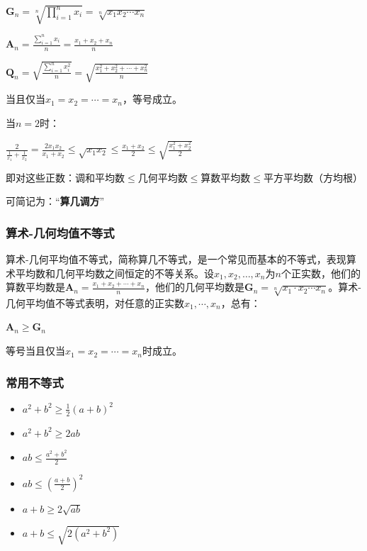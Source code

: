 \documentclass[UTF8]{ctexbook}
\newcommand{\upDownSum}[2]{\sum\limits_{#2}^{#1}}
\newcommand{\upDownProd}[2]{\prod\limits_{#2}^{#1}}
\begin{document}
{{{{$\mathbf{G}_n = \sqrt[n]{\upDownProd{n}{i = 1}x_i} = \sqrt[n]{x_1x_2\dotsm x_n}$

$\mathbf{A}_n = \frac{\upDownSum{n}{i = 1}x_i}{n} = \frac{x_1 + x_2 + x_n}{n}$

$\mathbf{Q}_n = \sqrt{\frac{\upDownSum{n}{i = 1}x^2_i}{n}} = \sqrt{\frac{x^2_1 + x^2_2 + \dotsm + x^2_n}{n}}$

当且仅当$x_1 = x_2 = \dotsm = x_n$，等号成立。

当$n = 2$时：

$\frac{2}{\frac{1}{x_1} + \frac{1}{x_2}} = \frac{2x_1x_2}{x_1 + x_2}\leq\sqrt{x_1x_2}\leq\frac{x_1 + x_2}{2}\leq\sqrt{\frac{x_1^2 + x_2^2}{2}}$

即对这些正数：调和平均数$\leq$几何平均数$\leq$算数平均数$\leq$平方平均数（方均根）

可简记为：“{\bfseries 算几调方}”
}%

\subsubsection{算术-几何均值不等式}{
  算术-几何平均值不等式，简称算几不等式，是一个常见而基本的不等式，表现算术平均数和几何平均数之间恒定的不等关系。设$x_1,x_2,\dots,x_n$为$n$个正实数，他们的算数平均数是$\mathbf{A}_n = \frac{x_1 + x_2 + \dotsm + x_n}{n}$，他们的几何平均数是$\mathbf{G}_n = \sqrt[n]{x_1\cdot x_2 \dotsm x_n}$。算术-几何平均值不等式表明，对任意的正实数$x_1,\dotsm,x_n$，总有：

  \begin{center}
    $\mathbf{A}_n\geq\mathbf{G}_n$
  \end{center}

  等号当且仅当$x_1 = x_2 = \dotsm = x_n$时成立。

}%

\subsubsection{常用不等式}{
  \begin{itemize}
    \item $a^2 + b^2 \geq \frac{1}{2}(a + b)^2$
    \item $a^2 + b^2 \geq 2ab$
    \item $ab \leq \frac{a^2 + b^2}{2}$
    \item $ab \leq (\frac{a + b}{2})^2$
    \item $a + b \geq 2\sqrt{ab}$
    \item $a + b \leq \sqrt{2(a^2 + b^2)}$
  \end{itemize}
}%

}}}
\end{document}

